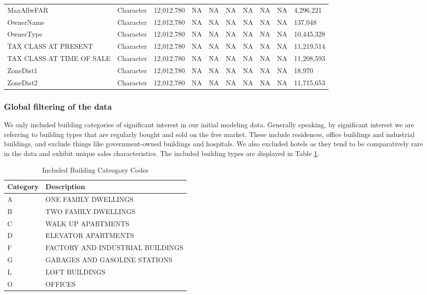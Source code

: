 \documentclass[12pt,]{article}
\begin{document}
\begin{table}
{\begin{tabular}[t]{llllllllll}
MaxAllwFAR & Character & 12,012,780 & NA & NA & NA & NA & NA & NA & 4,296,221\\
OwnerName & Character & 12,012,780 & NA & NA & NA & NA & NA & NA & 137,048\\
OwnerType & Character & 12,012,780 & NA & NA & NA & NA & NA & NA & 10,445,328\\
TAX CLASS AT PRESENT & Character & 12,012,780 & NA & NA & NA & NA & NA & NA & 11,219,514\\
\addlinespace
TAX CLASS AT TIME OF SALE & Character & 12,012,780 & NA & NA & NA & NA & NA & NA & 11,208,593\\
ZoneDist1 & Character & 12,012,780 & NA & NA & NA & NA & NA & NA & 18,970\\
ZoneDist2 & Character & 12,012,780 & NA & NA & NA & NA & NA & NA & 11,715,653\\
\bottomrule
\end{tabular}}
\end{table}

\hypertarget{global-filtering-of-the-data}{%
\subsubsection{Global filtering of the
data}\label{global-filtering-of-the-data}}

We only included building categories of significant interest in our
initial modeling data. Generally speaking, by significant interest we
are referring to building types that are regularly bought and sold on
the free market. These include residences, office buildings and
industrial buildings, and exclude things like government-owned buildings
and hospitals. We also excluded hotels as they tend to be comparatively
rare in the data and exhibit unique sales characteristics. The included
building types are displayed in Table \ref{tab:categoryTable}.

\begin{table}

\caption{\label{tab:unnamed-chunk-6}\label{tab:categoryTable} Included Building Cateogory Codes}
\centering
\begin{tabular}[t]{ll}
\toprule
Category & Description\\
\midrule
A & ONE FAMILY DWELLINGS\\
B & TWO FAMILY DWELLINGS\\
C & WALK UP APARTMENTS\\
D & ELEVATOR APARTMENTS\\
F & FACTORY AND INDUSTRIAL BUILDINGS\\
\addlinespace
G & GARAGES AND GASOLINE STATIONS\\
L & LOFT BUILDINGS\\
O & OFFICES\\
\bottomrule
\end{tabular}
\end{table}
\end{document}
